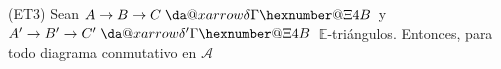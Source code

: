 \documentclass[preview]{standalone}
\makeatletter
\newcommand*{\da@xarrow}[7]{%
                                   \sbox0{$\ifx#7\scriptstyle\scriptscriptstyle\else\scriptstyle\fi#5#1#6\m@th$}%
                                   \sbox2{$\ifx#7\scriptstyle\scriptscriptstyle\else\scriptstyle\fi#5#2#6\m@th$}%
                                   \sbox4{$#7\dabar@\m@th$}%
                                   \dimen@=\wd0 %
                                   \ifdim\wd2 >\dimen@
                                     \dimen@=\wd2 %
                                   \fi
                                   \count@=2 %
                                   \def\da@bars{\dabar@\dabar@}%
                                   \@whiledim\count@\wd4<\dimen@\do{%
                                     \advance\count@\@ne
                                     \expandafter\def\expandafter\da@bars\expandafter{%
                                       \da@bars
                                       \dabar@ 
                                     }%
                                   }%
                                   \mathrel{#3}%
                                   \mathrel{%
                                     \mathop{\da@bars}\limits
                                     \ifx\\#1\\%
                                     \else
                                       _{\copy0}%
                                     \fi
                                     \ifx\\#2\\%
                                     \else
                                       ^{\copy2}%
                                     \fi
                                   }%
                                   \mathrel{#4}%
                                 }
\newcommand*{\da@rightarrow}{\mathchar"0\hexnumber@\symAMSa 4B }
\newcommand*{\xdashrightarrow}[2][]{%
                                   \mathrel{%
                                     \mathpalette{\da@xarrow{#1}{#2}{}\da@rightarrow{\,}{}}{}%
                                   }%
                                 }
\makeatother
\begin{document}
\begin{center}
(ET3) Sean $A\to B\to C\xdashrightarrow{\delta}$ y $A'\to B'\to C'\xdashrightarrow{\delta'}$ $\mathbb{E}$-triángulos. Entonces, para todo diagrama conmutativo en $\mathscr{A}$
\end{center}
\end{document}
